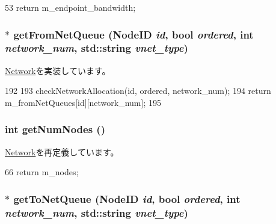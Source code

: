 \begin{DoxyCode}
53 { return m_endpoint_bandwidth; }
\end{DoxyCode}
\hypertarget{classSimpleNetwork_a8689f6299b0ac00d6ae6075a60829884}{
\subsubsection[{getFromNetQueue}]{ $\ast$ getFromNetQueue ({\bf NodeID} {\em id}, \/  bool {\em ordered}, \/  int {\em network\_\-num}, \/  std::string {\em vnet\_\-type})}}
\label{classSimpleNetwork_a8689f6299b0ac00d6ae6075a60829884}


\hyperlink{classNetwork_a28233bfa034d11609e66d504bce62359}{Network}を実装しています。


\begin{DoxyCode}
192 {
193     checkNetworkAllocation(id, ordered, network_num);
194     return m_fromNetQueues[id][network_num];
195 }
\end{DoxyCode}
\hypertarget{classSimpleNetwork_a52ab76ba6f0a40a06c6fc4043351824e}{
\subsubsection[{getNumNodes}]{\setlength{\rightskip}{0pt plus 5cm}int getNumNodes ()}}
\label{classSimpleNetwork_a52ab76ba6f0a40a06c6fc4043351824e}


\hyperlink{classNetwork_a7624554588ea569f360d6ea8e1cad409}{Network}を再定義しています。


\begin{DoxyCode}
66 {return m_nodes; }
\end{DoxyCode}
\hypertarget{classSimpleNetwork_a4b74c5f7524d071a8cb6137eca7942bd}{
\subsubsection[{getToNetQueue}]{ $\ast$ getToNetQueue ({\bf NodeID} {\em id}, \/  bool {\em ordered}, \/  int {\em network\_\-num}, \/  std::string {\em vnet\_\-type})}}
\label{classSimpleNetwork_a4b74c5f7524d071a8cb6137eca7942bd}


